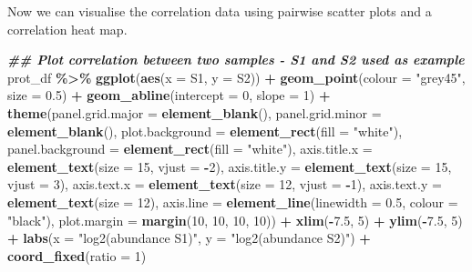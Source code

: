 \documentclass[9pt,a4paper,]{extarticle}
\newenvironment{Shaded}{\begin{snugshade}}{\end{snugshade}}
\newcommand{\AttributeTok}[1]{\textcolor[rgb]{0.13,0.29,0.53}{#1}}
\newcommand{\DecValTok}[1]{\textcolor[rgb]{0.00,0.00,0.81}{#1}}
\newcommand{\DocumentationTok}[1]{\textcolor[rgb]{0.56,0.35,0.01}{\textbf{\textit{#1}}}}
\newcommand{\FloatTok}[1]{\textcolor[rgb]{0.00,0.00,0.81}{#1}}
\newcommand{\FunctionTok}[1]{\textcolor[rgb]{0.13,0.29,0.53}{\textbf{#1}}}
\newcommand{\NormalTok}[1]{#1}
\newcommand{\SpecialCharTok}[1]{\textcolor[rgb]{0.81,0.36,0.00}{\textbf{#1}}}
\newcommand{\StringTok}[1]{\textcolor[rgb]{0.31,0.60,0.02}{#1}}
\begin{document}
Now we can visualise the correlation data using pairwise scatter plots and a
correlation heat map.

\begin{Shaded}
\begin{Highlighting}[]
\DocumentationTok{\#\# Plot correlation between two samples {-} S1 and S2 used as example}
\NormalTok{prot\_df }\SpecialCharTok{\%\textgreater{}\%}
  \FunctionTok{ggplot}\NormalTok{(}\FunctionTok{aes}\NormalTok{(}\AttributeTok{x =} \StringTok{\textasciigrave{}}\AttributeTok{S1}\StringTok{\textasciigrave{}}\NormalTok{, }\AttributeTok{y =} \StringTok{\textasciigrave{}}\AttributeTok{S2}\StringTok{\textasciigrave{}}\NormalTok{)) }\SpecialCharTok{+}
  \FunctionTok{geom\_point}\NormalTok{(}\AttributeTok{colour =} \StringTok{"grey45"}\NormalTok{, }\AttributeTok{size =} \FloatTok{0.5}\NormalTok{) }\SpecialCharTok{+}
  \FunctionTok{geom\_abline}\NormalTok{(}\AttributeTok{intercept =} \DecValTok{0}\NormalTok{, }\AttributeTok{slope =} \DecValTok{1}\NormalTok{) }\SpecialCharTok{+}
  \FunctionTok{theme}\NormalTok{(}\AttributeTok{panel.grid.major =} \FunctionTok{element\_blank}\NormalTok{(), }
        \AttributeTok{panel.grid.minor =} \FunctionTok{element\_blank}\NormalTok{(),}
        \AttributeTok{plot.background =} \FunctionTok{element\_rect}\NormalTok{(}\AttributeTok{fill =} \StringTok{"white"}\NormalTok{),}
        \AttributeTok{panel.background =} \FunctionTok{element\_rect}\NormalTok{(}\AttributeTok{fill =} \StringTok{"white"}\NormalTok{),}
        \AttributeTok{axis.title.x =} \FunctionTok{element\_text}\NormalTok{(}\AttributeTok{size =} \DecValTok{15}\NormalTok{, }\AttributeTok{vjust =} \SpecialCharTok{{-}}\DecValTok{2}\NormalTok{),}
        \AttributeTok{axis.title.y =} \FunctionTok{element\_text}\NormalTok{(}\AttributeTok{size =} \DecValTok{15}\NormalTok{, }\AttributeTok{vjust =} \DecValTok{3}\NormalTok{),}
        \AttributeTok{axis.text.x =} \FunctionTok{element\_text}\NormalTok{(}\AttributeTok{size =} \DecValTok{12}\NormalTok{, }\AttributeTok{vjust =} \SpecialCharTok{{-}}\DecValTok{1}\NormalTok{),}
        \AttributeTok{axis.text.y =} \FunctionTok{element\_text}\NormalTok{(}\AttributeTok{size =} \DecValTok{12}\NormalTok{),}
        \AttributeTok{axis.line =} \FunctionTok{element\_line}\NormalTok{(}\AttributeTok{linewidth =} \FloatTok{0.5}\NormalTok{, }\AttributeTok{colour =} \StringTok{"black"}\NormalTok{),}
        \AttributeTok{plot.margin =} \FunctionTok{margin}\NormalTok{(}\DecValTok{10}\NormalTok{, }\DecValTok{10}\NormalTok{, }\DecValTok{10}\NormalTok{, }\DecValTok{10}\NormalTok{)) }\SpecialCharTok{+}
  \FunctionTok{xlim}\NormalTok{(}\SpecialCharTok{{-}}\FloatTok{7.5}\NormalTok{, }\DecValTok{5}\NormalTok{) }\SpecialCharTok{+}
  \FunctionTok{ylim}\NormalTok{(}\SpecialCharTok{{-}}\FloatTok{7.5}\NormalTok{, }\DecValTok{5}\NormalTok{) }\SpecialCharTok{+}
  \FunctionTok{labs}\NormalTok{(}\AttributeTok{x =} \StringTok{"log2(abundance S1)"}\NormalTok{, }\AttributeTok{y =} \StringTok{"log2(abundance S2)"}\NormalTok{) }\SpecialCharTok{+}
  \FunctionTok{coord\_fixed}\NormalTok{(}\AttributeTok{ratio =} \DecValTok{1}\NormalTok{)}
\end{Highlighting}
\end{Shaded}
\end{document}
